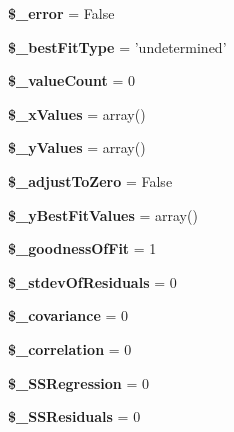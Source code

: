 \begin{DoxyCompactItemize}
\item 
{\bfseries \$\+\_\+error} = False\label{class_p_h_p_excel___best___fit_acce511121b059a08c6ceceae174ce261}

\item 
{\bfseries \$\+\_\+best\+Fit\+Type} = 'undetermined'\label{class_p_h_p_excel___best___fit_a4771ba52d86525c0c781339ec94f3466}

\item 
{\bfseries \$\+\_\+value\+Count} = 0\label{class_p_h_p_excel___best___fit_a95c87ee312a8bc488a570aab7b8f2a4d}

\item 
{\bfseries \$\+\_\+x\+Values} = array()\label{class_p_h_p_excel___best___fit_a834f683b0dc87d90c13cad52bf72959e}

\item 
{\bfseries \$\+\_\+y\+Values} = array()\label{class_p_h_p_excel___best___fit_a90704d996946f2eb6f6ef3f6cc115a48}

\item 
{\bfseries \$\+\_\+adjust\+To\+Zero} = False\label{class_p_h_p_excel___best___fit_a6fc58a7a080a636748ece966fd5307f6}

\item 
{\bfseries \$\+\_\+y\+Best\+Fit\+Values} = array()\label{class_p_h_p_excel___best___fit_a4deb065572f64e40830dbb88abeaefbf}

\item 
{\bfseries \$\+\_\+goodness\+Of\+Fit} = 1\label{class_p_h_p_excel___best___fit_a2808a27f7aa41f0dd1a70a3b4c9ee06f}

\item 
{\bfseries \$\+\_\+stdev\+Of\+Residuals} = 0\label{class_p_h_p_excel___best___fit_a8ab3a3239f80ea80f09c9b2e533e750f}

\item 
{\bfseries \$\+\_\+covariance} = 0\label{class_p_h_p_excel___best___fit_a74d4b43d020d37e95e80bb47e0e35687}

\item 
{\bfseries \$\+\_\+correlation} = 0\label{class_p_h_p_excel___best___fit_a13f068660bda96669ef8411a040afde3}

\item 
{\bfseries \$\+\_\+\+S\+S\+Regression} = 0\label{class_p_h_p_excel___best___fit_a02fc0960cbb376657d301f383c6732ba}

\item 
{\bfseries \$\+\_\+\+S\+S\+Residuals} = 0\label{class_p_h_p_excel___best___fit_a619c683888fe09717fea92b8b788b50a}


\end{DoxyCompactItemize}
